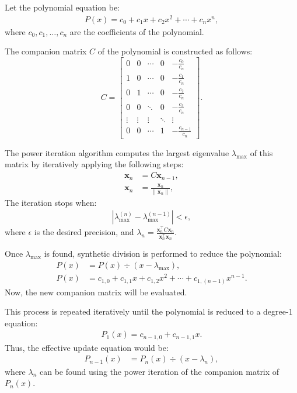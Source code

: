 \documentclass[journal]{IEEEtran}
\begin{document}
 Let the polynomial equation be:
 \begin{align}
 	P(x) = c_{0} + c_{1}x + c_{2}x^{2} + \cdots + c_{n}x^n,
 \end{align}
 where $c_0, c_1, \dots, c_n$ are the coefficients of the polynomial.  
 
 The companion matrix $C$ of the polynomial is constructed as follows:
 \[
 C = \begin{bmatrix} 
 	0 & 0 & \cdots & 0 & -\frac{c_0}{c_n} \\ 
 	1 & 0 & \cdots & 0 & -\frac{c_1}{c_n} \\ 
 	0 & 1 & \cdots & 0 & -\frac{c_2}{c_n} \\ 
 	0 & 0 & \ddots & 0 & -\frac{c_3}{c_n} \\ 
 	\vdots & \vdots & \vdots & \ddots & \vdots \\ 
 	0 & 0 & \cdots & 1 & -\frac{c_{n-1}}{c_n} 
 \end{bmatrix}.
 \]
 
 The power iteration algorithm computes the largest eigenvalue $\lambda_{\text{max}}$ of this matrix by iteratively applying the following steps:
 \begin{align}
 	\mathbf{x}_{n} &= C \mathbf{x}_{n-1}, \\
 	\mathbf{x}_{n} &= \frac{\mathbf{x}_{n}}{\|\mathbf{x}_{n}\|},
 \end{align}
 The iteration stops when:
 \begin{align}
 	|\lambda_{\text{max}}^{(n)} - \lambda_{\text{max}}^{(n-1)}| < \epsilon,
 \end{align}
 where $\epsilon$ is the desired precision, and $\lambda_{n} = \frac{\mathbf{x}_{n}^\top C \mathbf{x}_{n}}{\mathbf{x}_{n}^\top \mathbf{x}_{n}}$.  
 
 Once $\lambda_{\text{max}}$ is found, synthetic division is performed to reduce the polynomial:
 \begin{align}
 	P(x) &= P(x) \div (x - \lambda_{\text{max}}), \\
 	P(x) &= c_{1,0} + c_{1,1}x + c_{1,2}x^{2} + \cdots + c_{1,(n-1)}x^{n-1}.
 \end{align}
 Now, the new companion matrix will be evaluated.  
 
 This process is repeated iteratively until the polynomial is reduced to a degree-1 equation:
 \begin{align}
 	P_1(x) = c_{n-1,0} + c_{n-1,1}x.
 \end{align}
 Thus, the effective update equation would be:
 \begin{align}
 	P_{n-1}(x) &= P_{n}(x) \div (x - \lambda_{n}),
 \end{align}
 where $\lambda_{n}$ can be found using the power iteration of the companion matrix of $P_{n}(x)$.  
 
\end{document}
